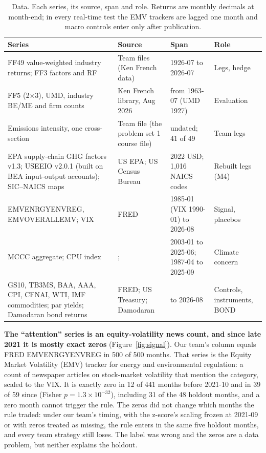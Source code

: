 \begin{table}[!htb]
\caption{Data. Each series, its source, span and role. Returns are monthly decimals at month-end; in every real-time test the EMV trackers are lagged one month and macro controls enter only after publication.}
\label{tab:data}
\centering\footnotesize
\setlength{\tabcolsep}{4pt}
\begin{tabularx}{\textwidth}{@{}L{5.2cm}L{3.3cm}L{3.0cm}Y@{}}
\toprule
Series & Source & Span & Role \\
\midrule
FF49 value-weighted industry returns; FF3 factors and RF & Team files (Ken French data) & 1926-07 to 2026-07 & Legs, hedge \\
FF5 (2$\times$3), UMD, industry BE/ME and firm counts & Ken French library, Aug 2026 & from 1963-07 (UMD 1927) & Evaluation \\
Emissions intensity, one cross-section & Team file (the problem set 1 course file) & undated; 41 of 49 & Team legs \\
EPA supply-chain GHG factors v1.3; USEEIO v2.0.1 (built on BEA input-output accounts); SIC--NAICS maps & US EPA; US Census Bureau & 2022 USD; 1,016 NAICS codes & Rebuilt legs (M4) \\
EMVENRGYENVREG, EMVOVERALLEMV; VIX & FRED \citep{bbdk2019} & 1985-01 (VIX 1990-01) to 2026-08 & Signal, placebos \\
MCCC aggregate; CPU index & \citet{ardia2023}; \citet{gavriilidis2021} & 2003-01 to 2025-06; 1987-04 to 2025-09 & Climate concern \\
GS10, TB3MS, BAA, AAA, CPI, CFNAI, WTI, IMF commodities; par yields; Damodaran bond returns & FRED; US Treasury; Damodaran & to 2026-08 & Controls, instruments, BOND \\
\bottomrule
\end{tabularx}
\end{table}

\textbf{The ``attention'' series is an equity-volatility news count, and since late 2021 it is mostly exact zeros} (Figure~\ref{fig:signal}). Our team's column equals FRED EMVENRGYENVREG in 500 of 500 months. That series is the \citet{bbdk2019} Equity Market Volatility (EMV) tracker for energy and environmental regulation: a count of newspaper articles on stock-market volatility that mention the category, scaled to the VIX. It is exactly zero in 12 of 441 months before 2021-10 and in 39 of 59 since (Fisher $p=1.3\times10^{-32}$), including 31 of the 48 holdout months, and a zero month cannot trigger the rule. The zeros did not change which months the rule traded: under our team's timing, with the z-score's scaling frozen at 2021-09 or with zeros treated as missing, the rule enters in the same five holdout months, and every team strategy still loses. The label was wrong and the zeros are a data problem, but neither explains the holdout.


